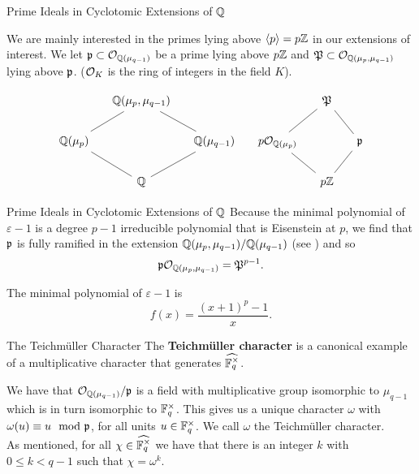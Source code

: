 \documentclass[presentation]{beamer}
\begin{document}
\begin{frame}{Prime Ideals in Cyclotomic Extensions of $\mathbb{Q}$}

We are mainly interested in the primes lying above $\langle p \rangle = p\mathbb{Z} $ in our extensions of interest. We let $\mathfrak{p} \subset \mathcal{O}_{\mathbb{Q}(\mu_{q-1})}$ be a prime lying above $p\mathbb{Z}$ and $\mathfrak{P} \subset \mathcal{O}_{\mathbb{Q}(\mu_p, \mu_{q-1})}$ lying above $\mathfrak{p}$. ($\mathcal{O}_K$ is the ring of integers in the field $K$).
\pause

\[\begin{tikzcd}[ampersand replacement=\&, column sep=small]
	\& {\mathbb{Q}(\mu_p,\mu_{q-1})} \&\&\& {\mathfrak{P}} \\
	{\mathbb{Q}(\mu_p)} \&\& {\mathbb{Q}(\mu_{q-1})} \& {p\mathcal{O}_{\mathbb{Q}(\mu_p)}} \&\& {\mathfrak{p}} \\
	\& {\mathbb{Q}} \&\&\& {p\bbZ}
	\arrow[no head, from=3-2, to=2-3]
	\arrow[no head, from=3-2, to=2-1]
	\arrow[no head, from=2-3, to=1-2]
	\arrow[no head, from=2-1, to=1-2]
	\arrow[no head, from=3-5, to=2-6]
	\arrow[no head, from=2-6, to=1-5]
	\arrow[no head, from=3-5, to=2-4]
	\arrow[no head, from=2-4, to=1-5]
\end{tikzcd}\]

\end{frame}

\begin{frame}{Prime Ideals in Cyclotomic Extensions of $\mathbb{Q}$}
Because the minimal polynomial of $\varepsilon - 1$ is a degree $p-1$ irreducible polynomial that is Eisenstein at $p$, we find that $\mathfrak{p}$ is fully ramified in the extension $\mathbb{Q}(\mu_p, \mu_{q-1}) / \mathbb{Q}(\mu_{q-1})$ (see \cite{Serre1979}) and so \[\mathfrak{p} \mathcal{O}_{\mathbb{Q}(\mu_p,\mu_{q-1})} = \mathfrak{P}^{p-1}.\]

\pause
\vspace{0.5cm}
The minimal polynomial of $\varepsilon - 1$ is \[f(x) = \frac{(x+1)^p -1}{x}.\]
\end{frame}


\begin{frame}{The Teichm\"uller Character}
The \textbf{Teichm\"uller character} is a canonical example of a multiplicative character that generates $\widehat{\mathbb{F}_q^\times}$.\\
\pause
\vspace{0.5cm}

We have that $\mathcal{O}_{\mathbb{Q}(\mu_{q-1})} / \mathfrak{p}$ is a field with multiplicative group isomorphic to $\mu_{q-1}$ which is in turn isomorphic to $\mathbb{F}_q^\times$. This gives us a unique character $\omega$ with $\omega(u) \equiv u \mod {\mathfrak{p}}$, for all units $u \in \mathbb{F}_q^\times$. We call $\omega$ the Teichm\"uller character.
\\
\pause
\vspace{0.5cm}
As mentioned, for all $\chi \in \widehat{\mathbb{F}_q^\times}$ we have that there is an integer $k$ with $0 \leq k < q-1$ such that $\chi = \omega^k$.

\end{frame}
\end{document}
